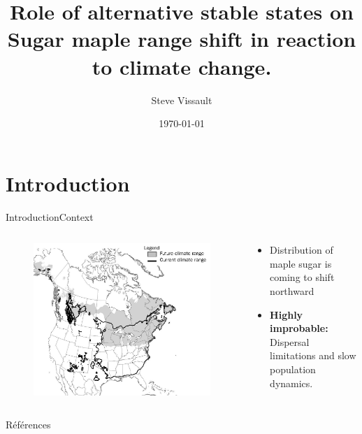 \documentclass[table]{eecslides}
\title[]{Role of alternative stable states on Sugar maple range shift in reaction to climate change.}
\author[]{\color{white}  Steve Vissault}
\institute[\color{white} UQAR]{\color{white} \textbf{Research proposal \\
Université du Québec à Rimouski}}
\date{ \color{white} \today}
\begin{document}
\begin{frame}[plain]
	\titlepage
\end{frame}


\section{Introduction}

\begin{frame}{Introduction}{Context}

\begin{columns}[c]
	\begin{column}{.4\paperwidth}
		\begin{figure}
			\includegraphics[width=.5\paperwidth]{sugar_map_distrib.jpg}
			\caption*{\scriptsize{\cite{Sciences2014}}}
		\end{figure}
	\end{column}
	\begin{column}{.5\paperwidth}
		 \begin{itemize}
		  \item Distribution of maple sugar is coming to shift northward
		  \item \textbf{Highly improbable: } Dispersal limitations and slow population dynamics.
		 \end{itemize}
	\end{column}
\end{columns}

\end{frame}





\begin{frame}[allowsframebreaks]{Références}
	\scriptsize
	
		
\end{frame}
\end{document}

